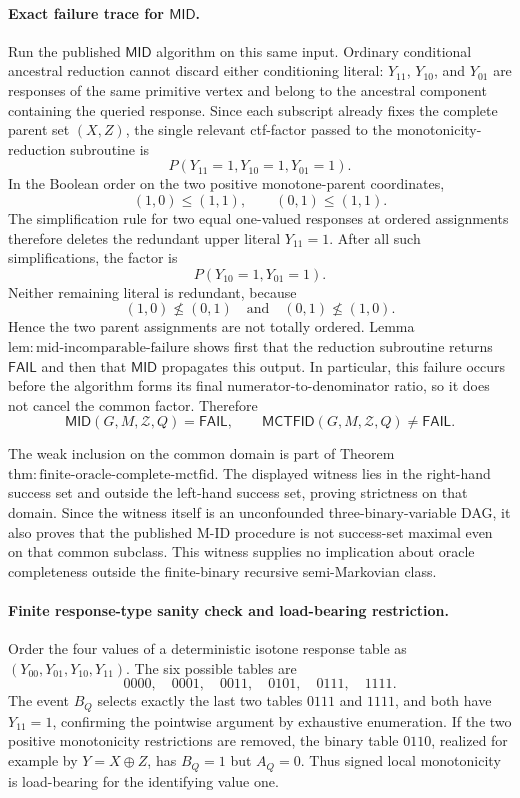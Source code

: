 \paragraph{Exact failure trace for \(\mathsf{MID}\).}
Run the published \(\mathsf{MID}\) algorithm on this same input.  Ordinary conditional ancestral reduction cannot discard either conditioning literal: \(Y_{11}\), \(Y_{10}\), and \(Y_{01}\) are responses of the same primitive vertex and belong to the ancestral component containing the queried response.  Since each subscript already fixes the complete parent set \((X,Z)\), the single relevant ctf-factor passed to the monotonicity-reduction subroutine is
\[
 P(Y_{11}=1,Y_{10}=1,Y_{01}=1).
\]
In the Boolean order on the two positive monotone-parent coordinates,
\[
 (1,0)\le(1,1),
 \qquad
 (0,1)\le(1,1).
\]
The simplification rule for two equal one-valued responses at ordered assignments therefore deletes the redundant upper literal \(Y_{11}=1\).  After all such simplifications, the factor is
\[
 P(Y_{10}=1,Y_{01}=1).
\]
Neither remaining literal is redundant, because
\[
 (1,0)\not\le(0,1)
 \quad\text{and}\quad
 (0,1)\not\le(1,0).
\]
Hence the two parent assignments are not totally ordered.  Lemma \(\mathrm{lem:mid\text{-}incomparable\text{-}failure}\) shows first that the reduction subroutine returns \(\mathsf{FAIL}\) and then that \(\mathsf{MID}\) propagates this output.  In particular, this failure occurs before the algorithm forms its final numerator-to-denominator ratio, so it does not cancel the common factor.  Therefore
\[
 \mathsf{MID}(G,M,\mathcal Z,Q)=\mathsf{FAIL},
 \qquad
 \mathsf{MCTFID}(G,M,\mathcal Z,Q)\ne\mathsf{FAIL}.
\]

The weak inclusion on the common domain is part of Theorem \(\mathrm{thm:finite\text{-}oracle\text{-}complete\text{-}mctfid}\).  The displayed witness lies in the right-hand success set and outside the left-hand success set, proving strictness on that domain.  Since the witness itself is an unconfounded three-binary-variable DAG, it also proves that the published M-ID procedure is not success-set maximal even on that common subclass.  This witness supplies no implication about oracle completeness outside the finite-binary recursive semi-Markovian class.

\paragraph{Finite response-type sanity check and load-bearing restriction.}
Order the four values of a deterministic isotone response table as \((Y_{00},Y_{01},Y_{10},Y_{11})\).  The six possible tables are
\[
 0000,\quad 0001,\quad 0011,\quad 0101,\quad 0111,\quad 1111.
\]
The event \(B_Q\) selects exactly the last two tables \(0111\) and \(1111\), and both have \(Y_{11}=1\), confirming the pointwise argument by exhaustive enumeration.  If the two positive monotonicity restrictions are removed, the binary table \(0110\), realized for example by \(Y=X\mathbin{\oplus}Z\), has \(B_Q=1\) but \(A_Q=0\).  Thus signed local monotonicity is load-bearing for the identifying value one.